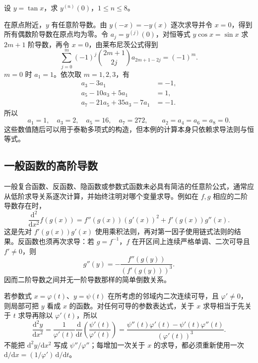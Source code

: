 \documentclass[UTF8,12pt,a4paper,fontset=fandol]{ctexbook}
\begin{document}
\begin{example}
\label{ex:tangent-derivatives-zero-through-eight}
设 $y=\tan x$，求 $y^{(n)}(0)$，$1\leq n\leq8$。
\end{example}
\begin{solve}
在原点附近，$y$ 有任意阶导数。由 $y(-x)=-y(x)$ 逐次求导并令 $x=0$，得到所有偶数阶导数在原点均为零。令 $a_j=y^{(j)}(0)$，对恒等式 $y\cos x=\sin x$ 求 $2m+1$ 阶导数，再令 $x=0$，由莱布尼茨公式得到
\[
    \sum_{j=0}^m(-1)^j\binom{2m+1}{2j}a_{2m+1-2j}
    =(-1)^m.
\]
$m=0$ 时 $a_1=1$。依次取 $m=1,2,3$，有
\[
\begin{aligned}
    a_3-3a_1&=-1,\\
    a_5-10a_3+5a_1&=1,\\
    a_7-21a_5+35a_3-7a_1&=-1.
\end{aligned}
\]
所以
\[
    a_1=1,\quad a_3=2,\quad a_5=16,\quad a_7=272,
    \qquad a_2=a_4=a_6=a_8=0.
\]
这些数值随后可以用于泰勒多项式的构造，但本例的计算本身只依赖求导法则与恒等式。
\end{solve}

\subsection{一般函数的高阶导数}
\label{subsec:higher-derivatives-of-general-functions}

一般复合函数、反函数、隐函数或参数式函数未必具有简洁的任意阶公式，通常应从低阶求导关系逐次计算，并始终注明对哪个变量求导。例如在 $f,g$ 相应的二阶导数存在时，
\begin{equation}
\label{eq:second-derivative-of-composite-function}
    \frac{\mathrm d^2}{\mathrm dx^2}f(g(x))
    =f''(g(x))(g'(x))^2+f'(g(x))g''(x).
\end{equation}
这是先对 $f'(g(x))g'(x)$ 使用乘积法则，再对第一因子使用链式法则的结果。反函数也须再次求导：若 $g=f^{-1}$，$f$ 在开区间上连续严格单调、二次可导且 $f'\ne0$，则
\begin{equation}
\label{eq:second-derivative-of-inverse-function}
    g''(y)=-\frac{f''(g(y))}{(f'(g(y)))^3}.
\end{equation}
因而二阶导数之间并无一阶导数那样的简单倒数关系。

若参数式 $x=\varphi(t)$、$y=\psi(t)$ 在所考虑的邻域内二次连续可导，且 $\varphi'\ne0$，则局部可把 $y$ 看成 $x$ 的函数。对任何可导的参数表达式，关于 $x$ 求导相当于先关于 $t$ 求导再除以 $\varphi'(t)$，所以
\begin{equation}
\label{eq:parametric-second-derivative}
    \frac{\mathrm d^2y}{\mathrm dx^2}
    =\frac1{\varphi'(t)}\frac{\mathrm d}{\mathrm dt}
      \left(\frac{\psi'(t)}{\varphi'(t)}\right)
    =\frac{\psi''(t)\varphi'(t)-\psi'(t)\varphi''(t)}{(\varphi'(t))^3}.
\end{equation}
不能把 $\mathrm d^2y/\mathrm dx^2$ 写成 $\psi''/\varphi''$；每增加一次关于 $x$ 的求导，都必须重新使用一次 $\mathrm d/\mathrm dx=(1/\varphi')\,\mathrm d/\mathrm dt$。
\end{document}
